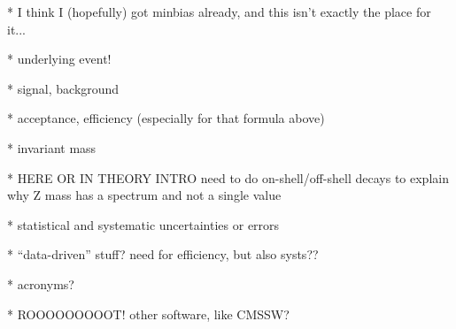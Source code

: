    * I think I (hopefully) got minbias already, and this isn't exactly the place for it... 

   * underlying event!

   * signal, background

   * acceptance, efficiency (especially for that formula above)

   * invariant mass

   * HERE OR IN THEORY INTRO need to do on-shell/off-shell decays 
to explain why Z mass has a spectrum and not a single value

   * statistical and systematic uncertainties or errors

   * ``data-driven'' stuff?  need for efficiency, but also systs??

   * acronyms?  

   * ROOOOOOOOOT!  other software, like CMSSW?













